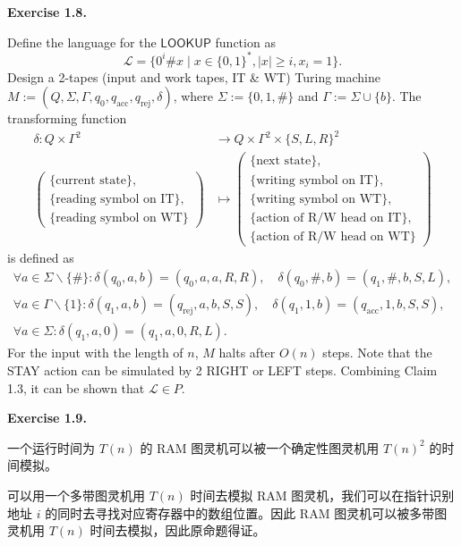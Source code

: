 \documentclass[a4paper]{article}
\newenvironment{exercise}[1]{
	\par
	\noindent\textbf{Exercise #1.}\quad
}{
	\par
	\bigskip
}
\begin{document}
\begin{exercise}{1.8}
    Define the language for the $\mathsf{LOOKUP}$ function as
    \[
        \mathcal L = \{0^i \# x \mid x\in \{0,1\}^*, |x| \geq i, x_i = 1\}.
    \]
    Design a 2-tapes (input and work tapes, IT \& WT) Turing machine 
    $M := (Q,\Sigma,\Gamma,q_0,q_\text{acc},q_\text{rej},\delta)$, 
    where $\Sigma := \{0,1,\#\}$ and $\Gamma := \Sigma \cup \{b\}$. 
    The transforming function
    \begin{align*}
        \delta : Q\times \Gamma^2 &\to Q\times \Gamma^2 \times \{S,L,R\}^2\\
        \left(\begin{array}{l}
            \{\text{current state}\},\\
            \{\text{reading symbol on IT}\},\\
            \{\text{reading symbol on WT}\}
        \end{array}\right) &\mapsto \left(\begin{array}{l}
            \{\text{next state}\},\\
            \{\text{writing symbol on IT}\},\\
            \{\text{writing symbol on WT}\},\\
            \{\text{action of R/W head on IT}\},\\
            \{\text{action of R/W head on WT}\}
        \end{array}\right)
    \end{align*}
    is defined as
    \[
        \begin{array}{l}
            \forall a \in \Sigma\backslash \{\#\}: \delta(q_0,a,b) = (q_0,a,a,R,R), \quad
            \delta(q_0,\#,b) = (q_1,\#,b,S,L),\\
            
            \forall a \in \Gamma\backslash\{1\}: \delta(q_1,a,b) = (q_\text{rej},a,b,S,S), \quad
            \delta(q_1,1,b) = (q_\text{acc},1,b,S,S),\\

            \forall a \in \Sigma: \delta(q_1,a,0) = (q_1,a,0,R,L).
        \end{array}
    \]
    For the input with the length of $n$, $M$ halts after $O(n)$ steps. Note that the STAY action can be simulated by 2 RIGHT or LEFT steps. Combining Claim 1.3, it can be shown that $\mathcal L \in P$.
\end{exercise}

\begin{exercise}{1.9}
    一个运行时间为 $T(n)$ 的 RAM 图灵机可以被一个确定性图灵机用 $T(n)^2$ 的时间模拟。

    可以用一个多带图灵机用 $T(n)$ 时间去模拟 RAM 图灵机，我们可以在指针识别地址 $i$ 的同时去寻找对应寄存器中的数组位置。因此 RAM 图灵机可以被多带图灵机用 $T(n)$ 时间去模拟，因此原命题得证。
\end{exercise}
\end{document}

